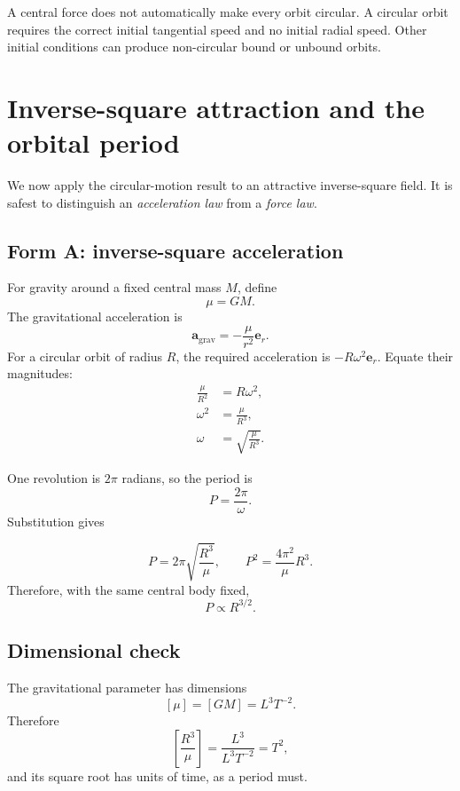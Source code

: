 \documentclass[11pt,a4paper]{article}
\newcommand{\er}{\bm e_r}
\newcommand{\acc}{\bm a}
\begin{document}
\begin{notecheck}
A central force does not automatically make every orbit circular. A circular orbit requires the correct initial tangential speed and no initial radial speed. Other initial conditions can produce non-circular bound or unbound orbits.
\end{notecheck}

\clearpage

\section{Inverse-square attraction and the orbital period}

We now apply the circular-motion result to an attractive inverse-square field. It is safest to distinguish an \emph{acceleration law} from a \emph{force law}.

\subsection{Form A: inverse-square acceleration}

For gravity around a fixed central mass $M$, define
\[
  \mu=GM.
\]
The gravitational acceleration is
\[
  \acc_{\text{grav}}=-\frac{\mu}{r^2}\er.
\]
For a circular orbit of radius $R$, the required acceleration is $-R\omega^2\er$. Equate their magnitudes:
\begin{align*}
  \frac{\mu}{R^2}&=R\omega^2,\\
  \omega^2&=\frac{\mu}{R^3},\\
  \omega&=\sqrt{\frac{\mu}{R^3}}.
\end{align*}

One revolution is $2\pi$ radians, so the period is
\[
  P=\frac{2\pi}{\omega}.
\]
Substitution gives
\begin{result}
\[
  \boxed{P=2\pi\sqrt{\frac{R^3}{\mu}}},
  \qquad
  \boxed{P^2=\frac{4\pi^2}{\mu}R^3}.
\]
Therefore, with the same central body fixed,
\[
  \boxed{P\propto R^{3/2}.}
\]
\end{result}

\subsection{Dimensional check}

The gravitational parameter has dimensions
\[
  [\mu]=[GM]=L^3T^{-2}.
\]
Therefore
\[
  \left[\frac{R^3}{\mu}\right]
  =\frac{L^3}{L^3T^{-2}}=T^2,
\]
and its square root has units of time, as a period must.
\end{document}
